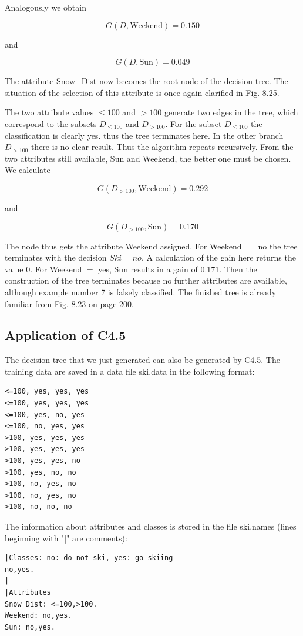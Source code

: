 \documentclass[10pt]{book}
\begin{document}
Analogously we obtain

$$
G(D, \text{Weekend}) = 0.150
$$

and

$$
G(D, \text{Sun}) = 0.049
$$

The attribute Snow\_Dist now becomes the root node of the decision tree. The situation of the selection of this attribute is once again clarified in Fig. 8.25.

The two attribute values $\leq 100$ and $>100$ generate two edges in the tree, which correspond to the subsets $D_{\leq 100}$ and $D_{>100}$. For the subset $D_{\leq 100}$ the classification is clearly yes. thus the tree terminates here. In the other branch $D_{>100}$ there is no clear result. Thus the algorithm repeats recursively. From the two attributes still available, Sun and Weekend, the better one must be chosen. We calculate

$$
G\left(D_{>100}, \text{Weekend}\right) = 0.292
$$

and

$$
G\left(D_{>100}, \text{Sun}\right) = 0.170
$$

The node thus gets the attribute Weekend assigned. For Weekend $=$ no the tree terminates with the decision $Ski=no$. A calculation of the gain here returns the value 0. For Weekend $=$ yes, Sun results in a gain of 0.171. Then the construction of the tree terminates because no further attributes are available, although example number 7 is falsely classified. The finished tree is already familiar from Fig. 8.23 on page 200.

\subsection{Application of C4.5}
The decision tree that we just generated can also be generated by C4.5. The training data are saved in a data file ski.data in the following format:

\begin{verbatim}
<=100, yes, yes, yes
<=100, yes, yes, yes
<=100, yes, no, yes
<=100, no, yes, yes
>100, yes, yes, yes
>100, yes, yes, yes
>100, yes, yes, no
>100, yes, no, no
>100, no, yes, no
>100, no, yes, no
>100, no, no, no
\end{verbatim}

The information about attributes and classes is stored in the file ski.names (lines beginning with "|" are comments):

\begin{verbatim}
|Classes: no: do not ski, yes: go skiing
no,yes.
|
|Attributes
Snow_Dist: <=100,>100.
Weekend: no,yes.
Sun: no,yes.
\end{verbatim}
\end{document}
